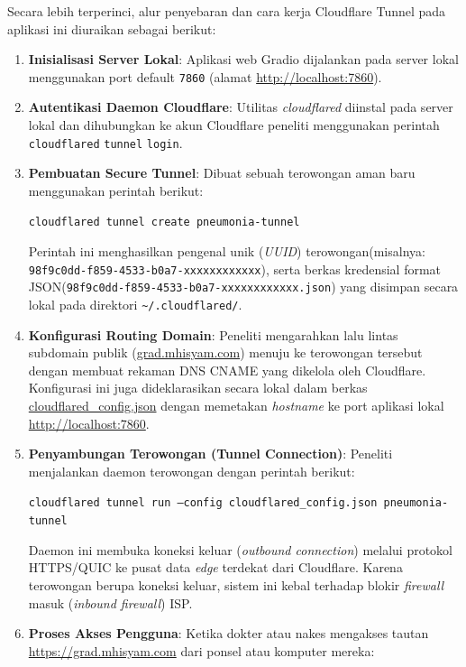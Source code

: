 \documentclass[12pt,a4paper,oneside]{book}
\begin{document}
Secara lebih terperinci, alur penyebaran dan cara kerja Cloudflare Tunnel pada aplikasi ini diuraikan sebagai berikut:
\begin{enumerate}
  \item \textbf{Inisialisasi Server Lokal}: Aplikasi web Gradio dijalankan pada server lokal menggunakan port default \texttt{7860} (alamat \url{http://localhost:7860}).
  \item \textbf{Autentikasi Daemon Cloudflare}: Utilitas \textit{cloudflared} diinstal pada server lokal dan dihubungkan ke akun Cloudflare peneliti menggunakan perintah \texttt{cloudflared} \texttt{tunnel} \texttt{login}.
  \item \textbf{Pembuatan Secure Tunnel}: Dibuat sebuah terowongan aman baru menggunakan perintah berikut:
  \begin{center}
    \texttt{cloudflared tunnel create pneumonia-tunnel}
  \end{center}
  Perintah ini menghasilkan pengenal unik (\textit{UUID}) terowongan\newline (misalnya: \texttt{98f9c0dd-}\allowbreak\texttt{f859-}\allowbreak\texttt{4533-}\allowbreak\texttt{b0a7-}\allowbreak\texttt{xxxxxxxxxxxx}), serta berkas kredensial format JSON\newline (\texttt{98f9c0dd-}\allowbreak\texttt{f859-}\allowbreak\texttt{4533-}\allowbreak\texttt{b0a7-}\allowbreak\texttt{xxxxxxxxxxxx.json}) yang disimpan secara lokal pada direktori \texttt{\textasciitilde/.cloudflared/}.
  \item \textbf{Konfigurasi Routing Domain}: Peneliti mengarahkan lalu lintas subdomain publik (\url{grad.mhisyam.com}) menuju ke terowongan tersebut dengan membuat rekaman DNS CNAME yang dikelola oleh Cloudflare. Konfigurasi ini juga dideklarasikan secara lokal dalam berkas \url{cloudflared_config.json} dengan memetakan \textit{hostname} ke port aplikasi lokal \url{http://localhost:7860}.
  \item \textbf{Penyambungan Terowongan (Tunnel Connection)}: Peneliti menjalankan daemon terowongan dengan perintah berikut:
  \begin{center}
    \texttt{cloudflared tunnel run --config cloudflared\_config.json pneumonia-tunnel}
  \end{center}
  Daemon ini membuka koneksi keluar (\textit{outbound connection}) melalui protokol HTTPS/QUIC ke pusat data \textit{edge} terdekat dari Cloudflare. Karena terowongan berupa koneksi keluar, sistem ini kebal terhadap blokir \textit{firewall} masuk (\textit{inbound firewall}) ISP.
  \item \textbf{Proses Akses Pengguna}: Ketika dokter atau nakes mengakses tautan \url{https://grad.mhisyam.com} dari ponsel atau komputer mereka:

\end{enumerate}
\end{document}

